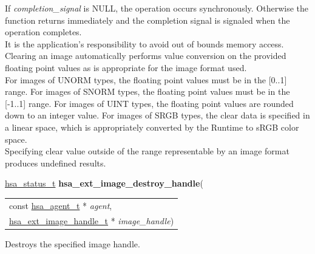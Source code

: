 \documentclass[final]{book}
\newcommand{\hsaarg}[1]{\textit{#1}}
\begin{document}
If \textit{completion_signal} is NULL, the operation occurs synchronously. Otherwise the function returns immediately and the completion signal is signaled when the operation completes.\\[2mm]
It is the application's responsibility to avoid out of bounds memory access.\\[2mm]
Clearing an image automatically performs value conversion on the provided floating point values as is appropriate for the image format used.\\[2mm]
For images of UNORM types, the floating point values must be in the [0..1] range. For images of SNORM types, the floating point values must be in the [-1..1] range. For images of UINT types, the floating point values are rounded down to an integer value. For images of SRGB types, the clear data is specified in a linear space, which is appropriately converted by the Runtime to sRGB color space.\\[2mm]
Specifying clear value outside of the range representable by an image format produces undefined results. 


\noindent\begin{tcolorbox}[breakable,nobeforeafter,colframe=white,colback=lightgray,left=0mm]
\hyperlink{group__status_1gad755322e7ff95456520e8abdbe90d225}{hsa_status_t} \hypertarget{group__images_1ga14b3aa6f6a82742beaa1f880a669ee56}{\textbf{hsa_ext_image_destroy_handle}}(
\vspace{-3.5mm}\begin{longtable}{@{}p{\textwidth}}
\hspace{1.7em}const \hyperlink{group__topology_1gab8db3fb886332a24acac08ec361e1d86}{hsa_agent_t} * \hsaarg{agent},\\
\hspace{1.7em}\hyperlink{group__images_1gae59456dc07140b58a2d526bcf01d2d88}{hsa_ext_image_handle_t} * \hsaarg{image_handle})\end{longtable}

\end{tcolorbox}
Destroys the specified image handle.
\end{document}
